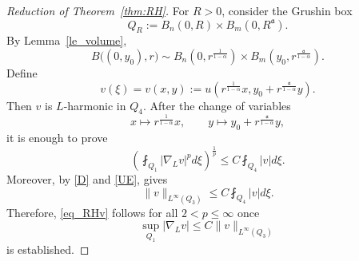 \documentclass[12pt]{amsart}
\begin{document}
\begin{proof}[Reduction of Theorem~\ref{thm:RH}]
For $R>0$, consider the Grushin box
\begin{equation*}
Q_R := B_n(0,R) \times B_m \left(0, R^{\mathfrak a} \right).
\end{equation*}
By Lemma~\ref{le_volume},
\begin{equation*}
B\big((0,y_0), r\big) \sim B_n\left(0, r^{\frac{1}{1-\alpha}}\right) \times B_m\left(y_0, r^{\frac{\mathfrak a}{1-\alpha}}\right).
\end{equation*}
Define
\begin{equation*}
v(\xi) = v(x,y) := u\left( r^{\frac{1}{1-\alpha}} x, y_0 + r^{\frac{\mathfrak a}{1-\alpha}} y \right).
\end{equation*}
Then $v$ is $L$-harmonic in $Q_4$. After the change of variables
\begin{equation*}
x \mapsto r^{\frac{1}{1-\alpha}}x, \qquad y \mapsto y_0+ r^{\frac{\mathfrak a}{1-\alpha}}y,
\end{equation*}
it is enough to prove
\begin{equation}\label{eq_RHv}
\left( \fint_{Q_1}|\nabla_L v|^p d\xi \right)^{\frac{1}{p}} \le C \fint_{Q_4} |v| d\xi.
\end{equation}
Moreover, by \eqref{D} and \eqref{UE}, \cite[Proposition~2.1]{CJKS} gives
\begin{equation*}
\| v \|_{L^\infty(Q_3)} \le C \fint_{Q_4} |v| d\xi.
\end{equation*}
Therefore, \eqref{eq_RHv} follows for all $2<p\le \infty$ once
\begin{equation}\label{eq_RH_show}
\sup_{Q_1} |\nabla_L v| \le C \| v \|_{L^\infty(Q_3)}
\end{equation}
is established.


\end{proof}
\end{document}
